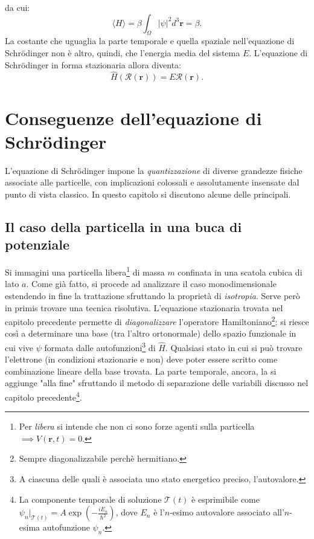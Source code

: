 \documentclass[a4paper,11pt]{report}
\begin{document}
da cui:
\begin{equation}
    \langle H \rangle = \beta \int_\Omega |\psi|^2 d^3\bm{r} = \beta.
\end{equation}
La costante che uguaglia la parte temporale e quella spaziale nell'equazione di Schrödinger non è altro, quindi, che l'energia media del sistema $E$. L'equazione di Schrödinger in forma stazionaria allora diventa:
\begin{equation}
    {\hat{H}(\mathcal{R}(\bm{r}))} = E{\mathcal{R}(\bm{r})}.
\end{equation}



\chapter{Conseguenze dell'equazione di Schrödinger}
L'equazione di Schrödinger impone la \textit{quantizzazione} di diverse grandezze fisiche associate alle particelle, con implicazioni colossali e assolutamente insensate dal punto di vista classico. In questo capitolo si discutono alcune delle principali. 

\section{Il caso della particella in una buca di potenziale}
Si immagini una particella libera\footnote{Per \textit{libera} si intende che non ci sono forze agenti sulla particella $\implies V(\bm{r}, t) = 0$.} di massa $m$ confinata in una scatola cubica di lato $a$. Come già fatto, si procede ad analizzare il caso monodimensionale estendendo in fine la trattazione sfruttando la proprietà di \textit{isotropia}. Serve però in primis trovare una tecnica risolutiva. L'equazione stazionaria trovata nel capitolo precedente permette di \textit{diagonalizzare} l'operatore Hamiltoniano\footnote{Sempre diagonalizzabile perchè hermitiano.}: si riesce così a determinare una base (tra l'altro ortonormale) dello spazio funzionale in cui vive $\psi$ formata dalle autofunzioni\footnote{A ciascuna delle quali è associata uno stato energetico preciso, l'autovalore.} di $\hat{H}$. Qualsiasi stato in cui si può trovare l'elettrone (in condizioni stazionarie e non) deve poter essere scritto come combinazione lineare della base trovata. La parte temporale, ancora, la si aggiunge "alla fine" sfruttando il metodo di separazione delle variabili discusso nel capitolo precedente\footnote{La componente temporale di soluzione $\mathcal{T}(t)$ è esprimibile come $\psi_n|_{\mathcal{T}(t)} = A\exp(-\frac{iE_n}{\hbar^2})$, dove $E_n$ è l'$n$-esimo autovalore associato all'$n$-esima autofunzione $\psi_n$.}.
\end{document}
